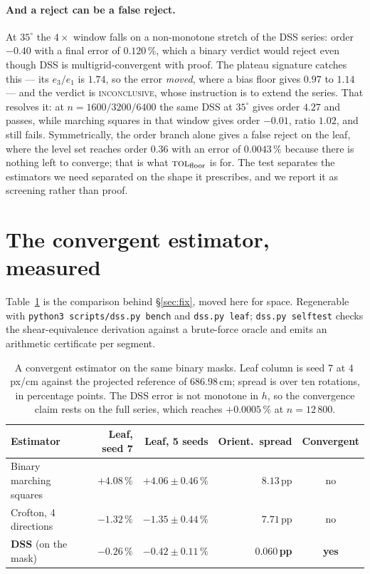 \documentclass{article}
\newcommand{\pct}[1]{$#1\,\%$}
\begin{document}
\paragraph{And a reject can be a false reject.} At $35^\circ$ the $4\times$ window falls on a
non-monotone stretch of the DSS series: order $-0.40$ with a final error of $0.120\,\%$, which a
binary verdict would reject even though DSS is multigrid-convergent with proof. The plateau
signature catches this --- its $e_3/e_1$ is $1.74$, so the error \emph{moved}, where a bias floor
gives $0.97$ to $1.14$ --- and the verdict is \textsc{inconclusive}, whose instruction is to extend
the series. That resolves it: at $n = 1600/3200/6400$ the same DSS at $35^\circ$ gives order $4.27$
and passes, while marching squares in that window gives order $-0.01$, ratio $1.02$, and still
fails. Symmetrically, the order branch alone gives a false reject on the leaf, where the level set
reaches order $0.36$ with an error of $0.0043\,\%$ because there is nothing left to converge; that
is what $\textsc{tol}_{\text{floor}}$ is for. The test separates the estimators we need separated
on the shape it prescribes, and we report it as screening rather than proof.

\section{The convergent estimator, measured}
\label{app:dss}

Table~\ref{tab:dss} is the comparison behind \S\ref{sec:fix}, moved here for space. Regenerable
with \texttt{python3 scripts/dss.py bench} and \texttt{dss.py leaf}; \texttt{dss.py selftest}
checks the shear-equivalence derivation against a brute-force oracle and emits an arithmetic
certificate per segment.

\begin{table}[htbp]
\centering
\caption{A convergent estimator on the same binary masks. Leaf column is seed 7 at $4$\,px/cm
against the projected reference of $686.98$\,cm; spread is over ten rotations, in percentage
points. The DSS error is not monotone in $h$, so the convergence claim rests on the full series,
which reaches \pct{+0.0005} at $n=12\,800$.}
\label{tab:dss}
\small
\begin{tabular}{lrrrc}
\toprule
Estimator & Leaf, seed 7 & Leaf, 5 seeds & Orient.\ spread & Convergent \\
\midrule
Binary marching squares    & $+4.08\,\%$ & $+4.06 \pm 0.46\,\%$ & $8.13$\,pp & no \\
Crofton, 4 directions      & $-1.32\,\%$ & $-1.35 \pm 0.44\,\%$ & $7.71$\,pp & no \\
\textbf{DSS} (on the mask) & $\mathbf{-0.26\,\%}$ & $\mathbf{-0.42 \pm 0.11\,\%}$ & $\mathbf{0.060}$\,\textbf{pp} & \textbf{yes} \\
\bottomrule
\end{tabular}
\end{table}
\end{document}
